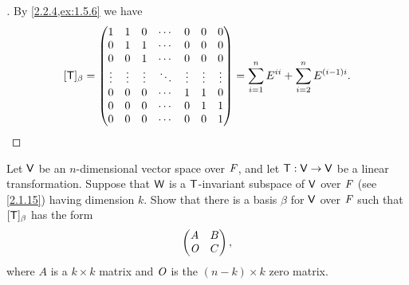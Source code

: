 \begin{proof}[]
  By \cref{2.2.4,ex:1.5.6} we have
  \[
    [\mathsf{T}]_{\beta} = \begin{pmatrix}
      1      & 1      & 0      & \cdots & 0      & 0      & 0      \\
      0      & 1      & 1      & \cdots & 0      & 0      & 0      \\
      0      & 0      & 1      & \cdots & 0      & 0      & 0      \\
      \vdots & \vdots & \vdots & \ddots & \vdots & \vdots & \vdots \\
      0      & 0      & 0      & \cdots & 1      & 1      & 0      \\
      0      & 0      & 0      & \cdots & 0      & 1      & 1      \\
      0      & 0      & 0      & \cdots & 0      & 0      & 1
    \end{pmatrix} = \sum_{i = 1}^n E^{i i} + \sum_{i = 2}^n E^{(i - 1) i}.
  \]
\end{proof}

\begin{ex}\label{ex:2.2.11}
  Let \(\mathsf{V}\) be an \(n\)-dimensional vector space over \(\mathit{F}\), and let \(\mathsf{T} : \mathsf{V} \to \mathsf{V}\) be a linear transformation.
  Suppose that \(\mathsf{W}\) is a \(\mathsf{T}\)-invariant subspace of \(\mathsf{V}\) over \(\mathit{F}\) (see \cref{2.1.15}) having dimension \(k\).
  Show that there is a basis \(\beta\) for \(\mathsf{V}\) over \(\mathit{F}\) such that \([\mathsf{T}]_{\beta}\) has the form
  \[
    \begin{pmatrix}
      A   & B \\
      \mathit{O} & C
    \end{pmatrix},
  \]
  where \(A\) is a \(k \times k\) matrix and \(\mathit{O}\) is the \((n - k) \times k\) zero matrix.
\end{ex}

